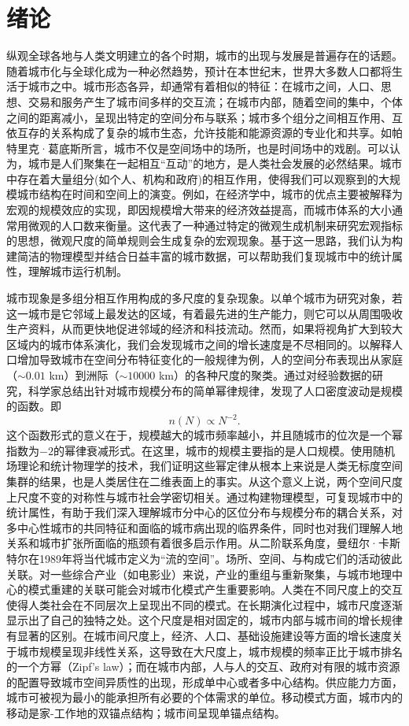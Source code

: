 \chapter{绪论}

纵观全球各地与人类文明建立的各个时期，城市的出现与发展是普遍存在的话题。随着城市化与全球化成为一种必然趋势，预计在本世纪末，世界大多数人口都将生活于城市之中\cite{batty2013}。城市形态各异，却通常有着相似的特征：在城市之间，人口、思想、交易和服务产生了城市间多样的交互流；在城市内部，随着空间的集中，个体之间的距离减小，呈现出特定的空间分布与联系；城市多个组分之间相互作用、互依互存的关系构成了复杂的城市生态，允许技能和能源资源的专业化和共享。如帕特里克·葛底斯所言，城市不仅是空间场中的场所，也是时间场中的戏剧。可以认为，城市是人们聚集在一起相互“互动”的地方，是人类社会发展的必然结果。城市中存在着大量组分(如个人、机构和政府)的相互作用，使得我们可以观察到的大规模城市结构在时间和空间上的演变\cite{Barthelemy2019}。例如，在经济学中，城市的优点主要被解释为宏观的规模效应的实现，即因规模增大带来的经济效益提高，而城市体系的大小通常用微观的人口数来衡量。这代表了一种通过特定的微观生成机制来研究宏观指标的思想，微观尺度的简单规则会生成复杂的宏观现象。基于这一思路，我们认为构建简洁的物理模型并结合日益丰富的城市数据，可以帮助我们复现城市中的统计属性，理解城市运行机制。

城市现象是多组分相互作用构成的多尺度的复杂现象。以单个城市为研究对象，若这一城市是它邻域上最发达的区域，有着最先进的生产能力，则它可以从周围吸收生产资料，从而更快地促进邻域的经济和科技流动\cite{Arbesman2009}。然而，如果将视角扩大到较大区域内的城市体系演化，我们会发现城市之间的增长速度是不尽相同的\cite{BerryThe}。以解释人口增加导致城市在空间分布特征变化的一般规律为例，人的空间分布表现出从家庭（$\sim 0.01$ km）到洲际（$\sim 10000$ km）的各种尺度的聚类。通过对经验数据的研究，科学家总结出针对城市规模分布的简单幂律规律，发现了人口密度波动是规模的函数。即\[n(N) \propto N^{−2}.\]这个函数形式的意义在于，规模越大的城市频率越小，并且随城市的位次是一个幂指数为$-2$的幂律衰减形式。在这里，城市的规模主要指的是人口规模。使用随机场理论和统计物理学的技术，我们证明这些幂定律从根本上来说是人类无标度空间集群的结果，也是人类居住在二维表面上的事实。从这个意义上说，两个空间尺度上尺度不变的对称性与城市社会学密切相关。通过构建物理模型，可复现城市中的统计属性，有助于我们深入理解城市分中心的区位分布与规模分布的耦合关系，对多中心性城市的共同特征和面临的城市病出现的临界条件，同时也对我们理解人地关系和城市扩张所面临的瓶颈有着很多启示作用。从二阶联系角度，曼纽尔·卡斯特尔在1989年将当代城市定义为“流的空间”。场所、空间、与构成它们的活动彼此关联\cite{BerryThe}。对一些综合产业（如电影业）来说，产业的重组与重新聚集，与城市地理中心的模式重建的关联可能会对城市化模式产生重要影响\cite{doi:10.1068/d040305}。人类在不同尺度上的交互使得人类社会在不同层次上呈现出不同的模式。在长期演化过程中，城市尺度逐渐显示出了自己的独特之处。这个尺度是相对固定的，城市内部与城市间的增长规律有显著的区别。在城市间尺度上，经济、人口、基础设施建设等方面的增长速度关于城市规模呈现非线性关系，这导致在大尺度上，城市规模的频率正比于城市排名的一个方幂（Zipf's law）；而在城市内部，人与人的交互、政府对有限的城市资源的配置导致城市空间异质性的出现，形成单中心或者多中心结构。供应能力方面，城市可被视为最小的能承担所有必要的个体需求的单位。移动模式方面，城市内的移动是家-工作地的双锚点结构；城市间呈现单锚点结构。

